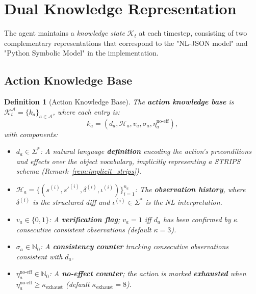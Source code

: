 \documentclass{article}
\newtheorem{definition}{Definition}
\newcommand{\calA}{\mathcal{A}}
\newcommand{\calH}{\mathcal{H}}
\newcommand{\calK}{\mathcal{K}}
\newcommand{\bbN}{\mathbb{N}}
\begin{document}

\section{Dual Knowledge Representation}
\label{sec:knowledge}

The agent maintains a \emph{knowledge state} $\calK_t$ at each timestep, consisting of two complementary representations that correspond to the "NL-JSON model" and "Python Symbolic Model" in the implementation.

\subsection{Action Knowledge Base}
\label{sec:action_kb}

\begin{definition}[Action Knowledge Base]
\label{def:action_kb}
The \textbf{action knowledge base} is $\calK^{\calA}_t = \{k_a\}_{a \in \calA}$, where each entry is:
\begin{equation}
k_a = (d_a, \calH_a, v_a, \sigma_a, \eta_a^{\text{no-eff}}),
\end{equation}
with components:
\begin{itemize}[nosep]
    \item $d_a \in \Sigma^*$: A natural language \textbf{definition} encoding the action's preconditions and effects over the object vocabulary, implicitly representing a STRIPS schema (Remark~\ref{rem:implicit_strips}).
    \item $\calH_a = \{(s^{(i)}, s'^{(i)}, \delta^{(i)}, \iota^{(i)})\}_{i=1}^{n_a}$: The \textbf{observation history}, where $\delta^{(i)}$ is the structured diff and $\iota^{(i)} \in \Sigma^*$ is the NL interpretation.
    \item $v_a \in \{0, 1\}$: A \textbf{verification flag}; $v_a = 1$ iff $d_a$ has been confirmed by $\kappa$ consecutive consistent observations (default $\kappa = 3$).
    \item $\sigma_a \in \bbN_0$: A \textbf{consistency counter} tracking consecutive observations consistent with $d_a$.
    \item $\eta_a^{\text{no-eff}} \in \bbN_0$: A \textbf{no-effect counter}; the action is marked \textbf{exhausted} when $\eta_a^{\text{no-eff}} \geq \kappa_{\text{exhaust}}$ (default $\kappa_{\text{exhaust}} = 8$).
\end{itemize}
\end{definition}
\end{document}
